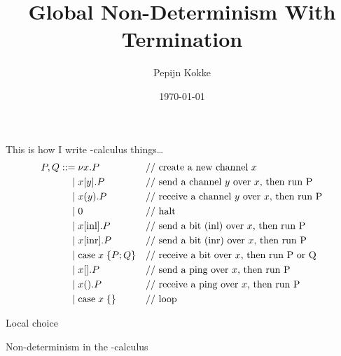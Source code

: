 \documentclass{beamer}
\title{Global Non-Determinism With Termination}
\date{\today}
\author{Pepijn Kokke}
\institute{University of Edinburgh}
\begin{document}
\maketitle

\begin{frame}{This is how I write \textpi-calculus things\dots}
  \[\!
    \begin{aligned}
      P, Q ::=&\;\nu x.P        &&\text{// create a new channel $x$}
      \\  \mid&\;x[y].P         &&\text{// send a channel $y$ over $x$, then run P}
      \\  \mid&\;x(y).P         &&\text{// receive a channel $y$ over $x$, then run P}
      \\  \mid&\;0              &&\text{// halt}
      \\  \mid&\;\inl{x}P       &&\text{// send a bit (inl) over $x$, then run P}
      \\  \mid&\;\inr{x}P       &&\text{// send a bit (inr) over $x$, then run P}
      \\  \mid&\;\case{x}{P}{Q} &&\text{// receive a bit over $x$, then run P or Q}
      \\  \mid&\;x[].P          &&\text{// send a ping over $x$, then run P}
      \\  \mid&\;x().P          &&\text{// receive a ping over $x$, then run P}
      \\  \mid&\;\case{x}{}{}   &&\text{// loop}
    \end{aligned}
  \] 
\end{frame}

\begin{frame}{Local choice}
  \centering
\end{frame}

\begin{frame}{Non-determinism in the \textpi-calculus}
  \centering
\end{frame}
\end{document}
